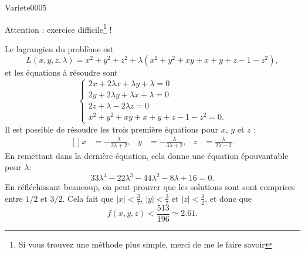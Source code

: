 
\begin{corrige}{Variete0005}

	Attention : exercice difficile\footnote{Si vous trouvez une méthode plus simple, merci de me le faire savoir} !

	Le lagrangien du problème est
	\begin{equation}
		L(x,y,z,\lambda)=x^2+y^2+z^2+\lambda(x^2+y^2+xy+x+y+z-1-z^2),
	\end{equation}
	et les équations à résoudre sont
	\begin{equation}
		\left\{
		\begin{array}{ll}
			2x+2\lambda x+\lambda y+\lambda=0\\
			2y+2\lambda y+\lambda x+\lambda =0\\
			2z+\lambda-2\lambda z=0\\
			x^2+y^2+xy+x+y+z-1-z^2=0.
		\end{array}
		\right.
	\end{equation}
	Il est possible de résoudre les trois première équations pour $x$, $y$ et $z$ :
	\begin{equation}
		\begin{aligned}[]
			x&=-\frac{ \lambda }{ 2\lambda+2 },&y&=-\frac{ \lambda }{ 3\lambda+2 },&z&=\frac{ \lambda }{ 2\lambda-2 }.
		\end{aligned}
	\end{equation}
	En remettant dans la dernière équation, cela donne une équation épouvantable pour $\lambda$:
	\begin{equation}
		33\lambda^4-22\lambda^3-44\lambda^2-8\lambda+16=0.
	\end{equation}
	En réfléchissant beaucoup, on peut prouver que les solutions sont sont comprises entre $1/2$ et $3/2$. Cela fait que $| x |<\frac{ 3 }{ 7 }$, $| y |<\frac{ 3 }{ 7 }$ et $| z |<\frac{ 3 }{ 2 }$, et donc que
	\begin{equation}
		f(x,y,z)<\frac{ 513 }{ 196 }\simeq 2.61.
	\end{equation}
	
		

\end{corrige}
